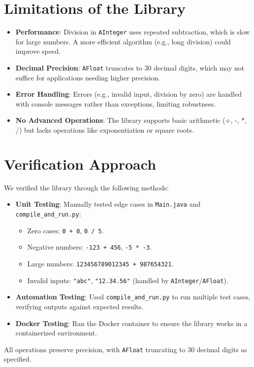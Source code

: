 \documentclass[a4paper,12pt]{article}
\begin{document}
\section{Limitations of the Library}
\begin{itemize}
    \item \textbf{Performance}: Division in \texttt{AInteger} uses repeated subtraction, which is slow for large numbers. A more efficient algorithm (e.g., long division) could improve speed.
    \item \textbf{Decimal Precision}: \texttt{AFloat} truncates to 30 decimal digits, which may not suffice for applications needing higher precision.
    \item \textbf{Error Handling}: Errors (e.g., invalid input, division by zero) are handled with console messages rather than exceptions, limiting robustness.
    \item \textbf{No Advanced Operations}: The library supports basic arithmetic (+, -, *, /) but lacks operations like exponentiation or square roots.
\end{itemize}

\section{Verification Approach}
We verified the library through the following methods:
\begin{itemize}
    \item \textbf{Unit Testing}: Manually tested edge cases in \texttt{Main.java} and \texttt{compile\_and\_run.py}:
    \begin{itemize}
        \item Zero cases: \texttt{0 + 0}, \texttt{0 / 5}.
        \item Negative numbers: \texttt{-123 + 456}, \texttt{-5 * -3}.
        \item Large numbers: \texttt{123456789012345 + 987654321}.
        \item Invalid inputs: \texttt{"abc"}, \texttt{"12.34.56"} (handled by \texttt{AInteger}/\texttt{AFloat}).
    \end{itemize}
    \item \textbf{Automation Testing}: Used \texttt{compile\_and\_run.py} to run multiple test cases, verifying outputs against expected results.
    \item \textbf{Docker Testing}: Ran the Docker container to ensure the library works in a containerized environment.
\end{itemize}
All operations preserve precision, with \texttt{AFloat} truncating to 30 decimal digits as specified.
\end{document}
